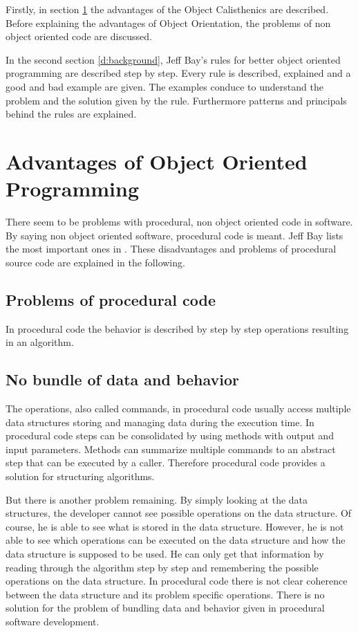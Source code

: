 Firstly, in section \ref{d:advantagesoo} the advantages of the Object Calisthenics are described. Before explaining the advantages of Object Orientation, the problems of non object oriented code are discussed. 

In the second section \ref{d:background}, Jeff Bay's rules for better object oriented programming are described step by step. Every rule is described, explained and a good and bad example are given. The examples conduce to understand the problem and the solution given by the rule. Furthermore patterns and principals behind the rules are explained. 

\section{Advantages of Object Oriented Programming}
\label{d:advantagesoo}
There seem to be problems with procedural, non object oriented code in software. By saying non object oriented software, procedural code is meant. Jeff Bay lists the most important ones in \cite[p.70]{oc2008}. These disadvantages and problems of procedural source code are explained in the following. 

\subsection{Problems of procedural code} 
In procedural code the behavior is described by step by step operations resulting in an algorithm. 

\subsection*{No bundle of data and behavior}
The operations, also called commands, in procedural code usually access multiple data structures storing and managing data during the execution time. In procedural code steps can be consolidated by using methods with output and input parameters. Methods can summarize multiple commands to an abstract step that can be executed by a caller. Therefore procedural code provides a solution for structuring algorithms.

But there is another problem remaining. By simply looking at the data structures, the developer cannot see possible operations on the data structure. Of course, he is able to see what is stored in the data structure. However, he is not able to see which operations can be executed on the data structure and how the data structure is supposed to be used. He can only get that information by reading through the algorithm step by step and remembering the possible operations on the data structure. In procedural code there is not clear coherence between the data structure and its problem specific operations. There is no solution for the problem of bundling data and behavior given in procedural software development. 


